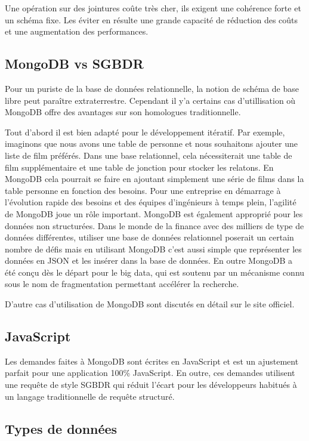 Une opération sur des jointures coûte très cher, ils exigent une cohérence forte et un schéma fixe. Les éviter en résulte une grande capacité de réduction des coûts et une augmentation des performances. 

\subsection{MongoDB vs SGBDR}

Pour un puriste de la base de données relationnelle, la notion de schéma de base libre peut paraître extraterrestre. Cependant il y’a certains cas d’utillisation où MongoDB  offre des avantages sur son homologues traditionnelle. 

Tout d’abord il est bien adapté pour le développement itératif. Par exemple, imaginons que nous avons une table de personne et nous souhaitons ajouter une liste de film préférés. Dans une base relationnel, cela nécessiterait une table de film supplémentaire et une table de jonction pour stocker les relatons. En MongoDB cela pourrait se faire en ajoutant simplement une série de films dans la table personne en fonction des besoins. Pour une entreprise en démarrage à l’évolution rapide des besoins et des équipes d'ingénieurs à temps plein, l’agilité de MongoDB joue un rôle important.
MongoDB est également approprié pour les données non structurées. Dans le monde de la finance avec des milliers de type de données différentes, utiliser une base de données relationnel poserait un certain nombre de défis mais en utilisant MongoDB c’est aussi simple que représenter les données en JSON et les insérer dans la base de données.
En outre MongoDB a été conçu dès le départ pour le big data, qui est soutenu par un mécanisme connu sous le nom de fragmentation permettant accélérer la recherche.

D’autre cas d’utilisation de MongoDB sont discutés en détail sur le site officiel.

\subsection{JavaScript}

Les demandes faites à MongoDB sont écrites en JavaScript et est un ajustement parfait pour une application 100\% JavaScript. En outre, ces demandes utilisent une requête de style SGBDR qui réduit l’écart pour les développeurs habitués à un langage traditionnelle de requête structuré.

\subsection{Types de données}

